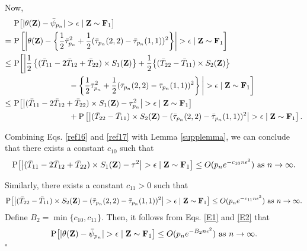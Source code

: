 \documentclass[twoside]{article}
\newcommand{\bZ}{\mathbf{Z}}
\newcommand{\bF}{\mathbf{F}}
\newcommand{\0}{\mathbf{0}}
\newcommand{\1}{\mathbf{1}}
\newcommand*{\QEDB}{\hfill\ensuremath{\square}}
\numberwithin{equation}{section}
\begin{document}
Now,
\begin{align}\label{ref18}
 &\ {\rm P}\big [|\theta(\bZ) - \bar{\psi}_{p_n}|>\epsilon \mid \bZ\sim\bF_1 \big]\nonumber \\
 =&\ {\rm P}\left [\left |\theta(\bZ) - \left \{\frac{1}{2}\bar{\tau}^2_{p_n} + \frac{1}{2}(\bar{\tau}_{p_n}(2,2)-\bar{\tau}_{p_n}(1,1))^2\right \}\right |>\epsilon \mid \bZ\sim\bF_1 \right ]\nonumber \\
 \leq &\ {\rm P}\bigg [\bigg |\frac{1}{2}\left \{(\bar{T}_{11}-2\bar{T}_{12}+\bar{T}_{22})\times S_1(\bZ)\right \}
 +\frac{1}{2}\big \{(\bar{T}_{22}-\bar{T}_{11})\times S_2(\bZ)\big \}\nonumber \\
 &\hspace{1in} - \left \{\frac{1}{2}\bar{\tau}_{p_n}^2 + \frac{1}{2}(\bar{\tau}_{p_n}(2,2)-\bar{\tau}_{p_n}(1,1))^2\right \}\bigg |>\epsilon \mid \bZ\sim\bF_1 \bigg]\nonumber \\
 \leq &\ {\rm P}\big [\big |(\bar{T}_{11}-2\bar{T}_{12}+\bar{T}_{22})\times S_1(\bZ) - \tau^2_{p_n}\big |>\epsilon \mid \bZ\sim\bF_1 \big]\nonumber \\
 &\hspace{1in}+{\rm P}\left [\big |(\bar{T}_{22}-\bar{T}_{11})\times S_2(\bZ) - (\bar{\tau}_{p_n}(2,2)-\bar{\tau}_{p_n}(1,1))^2\big |>\epsilon \mid \bZ\sim\bF_1 \right].
\end{align}

Combining Eqs. \eqref{ref16} and \eqref{ref17} with Lemma \ref{supplemma}, we can conclude that there exists a constant $c_{10}$ such that
\begin{align}\label{E1}
 {\rm P}\big [\big |(\bar{T}_{11}-2\bar{T}_{12}+\bar{T}_{22})\times S_1(\bZ) - \tau^2\big |>\epsilon \mid \bZ\sim\bF_1 \big]\leq O(p_n e^{-c_{10} n\epsilon^2})\text{ as }n\to\infty.
\end{align}

Similarly, there exists a constant $c_{11}>0$ such that
\begin{align}\label{E2}
 {\rm P}\big [\big |(\bar{T}_{22}-\bar{T}_{11})\times S_2(\bZ) - (\bar{\tau}_{p_n}(2,2)-\bar{\tau}_{p_n}(1,1))^2\big |>\epsilon \mid \bZ\sim\bF_1 \big]\leq O(p_n e^{-c_{11} n\epsilon^2})\text{ as }n\to\infty.
\end{align}
Define $B_2 = \min\{c_{10},c_{11}\}$. Then, it follows from Eqs. \eqref{E1} and \eqref{E2} that $${\rm P}\big [|\theta(\bZ) - \bar{\psi}_{p_n}|>\epsilon \mid \bZ\sim\bF_1 \big]\leq O(p_n e^{-B_2 n\epsilon^2})\text{ as }n\to\infty.$$
\hfill \QEDB\newline
\end{document}
